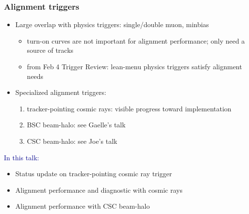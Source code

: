 \documentclass[compress]{beamer}
\begin{document}
\begin{frame}
\frametitle{Alignment triggers}
\begin{itemize}
\item Large overlap with physics triggers: single/double muon, minbias
\begin{itemize}
\item turn-on curves are not important for alignment performance; only need a source of tracks
\item from Feb 4 Trigger Review: lean-menu physics triggers satisfy alignment needs
\end{itemize}

\item Specialized alignment triggers:
\begin{enumerate}
\item tracker-pointing cosmic rays: visible progress toward implementation
\item BSC beam-halo: see Gaelle's talk
\item CSC beam-halo: see Joe's talk
\end{enumerate}
\end{itemize}

\vfill
\hspace{-0.83 cm} \textcolor{darkblue}{\Large In this talk:}
\begin{itemize}
\item Status update on tracker-pointing cosmic ray trigger
\item Alignment performance and diagnostic with cosmic rays
\item Alignment performance with CSC beam-halo
\end{itemize}
\end{frame}
\end{document}
